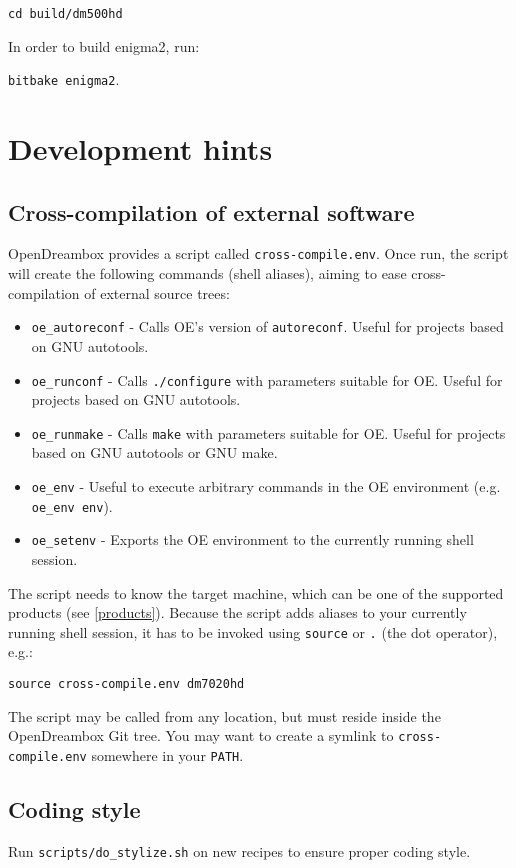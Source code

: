 \documentclass[a4paper]{article}
\newcommand{\shell}[1]{\texttt{\small #1}}
\begin{document}
     \shell{cd build/dm500hd}

     In order to build enigma2, run:

     \shell{bitbake enigma2}.

\section{Development hints}

  \subsection{Cross-compilation of external software}
    OpenDreambox provides a script called \shell{cross-compile.env}. Once run, the script will create
    the following commands (shell aliases), aiming to ease cross-compilation of external source trees:

    \begin{itemize}
      \item \shell{oe\_autoreconf} - Calls OE's version of \shell{autoreconf}. Useful for projects based on GNU autotools.
      \item \shell{oe\_runconf} - Calls \shell{./configure} with parameters suitable for OE. Useful for projects based on GNU autotools.
      \item \shell{oe\_runmake} - Calls \shell{make} with parameters suitable for OE. Useful for projects based on GNU autotools or GNU make.
      \item \shell{oe\_env} - Useful to execute arbitrary commands in the OE environment (e.g. \shell{oe\_env env}).
      \item \shell{oe\_setenv} - Exports the OE environment to the currently running shell session.
    \end{itemize}

    The script needs to know the target machine, which can be one of the supported products (see \ref{products}). Because the script
    adds aliases to your currently running shell session, it has to be invoked using \shell{source} or \shell{.} (the dot operator), e.g.:

    \shell{source cross-compile.env dm7020hd}

    The script may be called from any location, but must reside inside the OpenDreambox Git tree.
    You may want to create a symlink to \shell{cross-compile.env} somewhere in your \shell{PATH}.

  \subsection{Coding style}
    Run \shell{scripts/do\_stylize.sh} on new recipes to ensure proper coding style.
\end{document}
